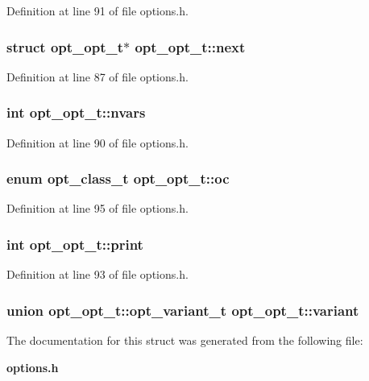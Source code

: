 Definition at line 91 of file options.h.
\subsubsection[{next}]{\setlength{\rightskip}{0pt plus 5cm}struct {\bf opt\_\-opt\_\-t}$\ast$ {\bf opt\_\-opt\_\-t::next}\hspace{0.3cm}{\tt  [read]}}\label{structopt__opt__t_d0a1d77dfba369e51633ea8578fa547d}




Definition at line 87 of file options.h.
\subsubsection[{nvars}]{\setlength{\rightskip}{0pt plus 5cm}int {\bf opt\_\-opt\_\-t::nvars}}\label{structopt__opt__t_068a396e748f7f4bff893b5a5b91e2e6}




Definition at line 90 of file options.h.
\subsubsection[{oc}]{\setlength{\rightskip}{0pt plus 5cm}enum {\bf opt\_\-class\_\-t} {\bf opt\_\-opt\_\-t::oc}}\label{structopt__opt__t_618939d03d4b5f9a89a0cb806eb0d20b}




Definition at line 95 of file options.h.
\subsubsection[{print}]{\setlength{\rightskip}{0pt plus 5cm}int {\bf opt\_\-opt\_\-t::print}}\label{structopt__opt__t_a6dc2cb2d7967029dbb2af50d0f5af00}




Definition at line 93 of file options.h.
\subsubsection[{variant}]{\setlength{\rightskip}{0pt plus 5cm}union {\bf opt\_\-opt\_\-t::opt\_\-variant\_\-t}  {\bf opt\_\-opt\_\-t::variant}}\label{structopt__opt__t_63843acb4515ec83dc2a492f189e9168}




The documentation for this struct was generated from the following file:\begin{CompactItemize}
\item 
{\bf options.h}\end{CompactItemize}
